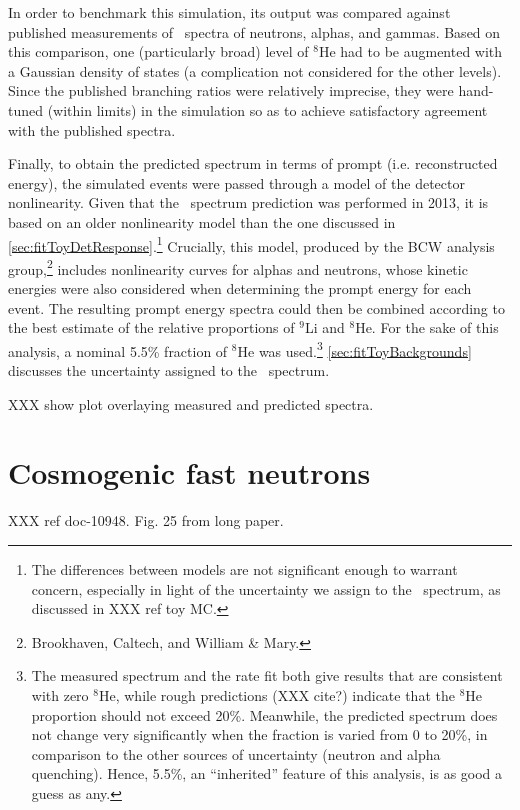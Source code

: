\documentclass[../thesis.tex]{subfiles}
\begin{document}
In order to benchmark this simulation, its output was compared against published
measurements of \LiHe\ spectra of neutrons, alphas, and gammas. Based on this
comparison, one (particularly broad) level of $^8$He had to be augmented with a
Gaussian density of states (a complication not considered for the other
levels). Since the published branching ratios were relatively imprecise, they
were hand-tuned (within limits) in the simulation so as to achieve satisfactory
agreement with the published spectra.

Finally, to obtain the predicted spectrum in terms of prompt (i.e. reconstructed
energy), the simulated events were passed through a model of the detector
nonlinearity. Given that the \LiHe\ spectrum prediction was performed in 2013,
it is based on an older nonlinearity model than the one discussed in
\autoref{sec:fitToyDetResponse}.\footnote{The differences between models are not
  significant enough to warrant concern, especially in light of the uncertainty
  we assign to the \LiHe\ spectrum, as discussed in XXX ref toy MC.} Crucially,
this model, produced by the BCW analysis group,\footnote{Brookhaven, Caltech,
  and William \& Mary.} includes nonlinearity curves for alphas and neutrons,
whose kinetic energies were also considered when determining the prompt energy
for each event. The resulting prompt energy spectra could then be combined
according to the best estimate of the relative proportions of $^9$Li and
$^8$He. For the sake of this analysis, a nominal 5.5\% fraction of $^8$He was
used.\footnote{The measured spectrum and the rate fit both give results that are
  consistent with zero $^8$He, while rough predictions (XXX cite?) indicate that
  the $^8$He proportion should not exceed 20\%. Meanwhile, the predicted
  spectrum does not change very significantly when the fraction is varied from 0
  to 20\%, in comparison to the other sources of uncertainty (neutron and alpha
  quenching). Hence, 5.5\%, an ``inherited'' feature of this analysis, is as
  good a guess as any.} \autoref{sec:fitToyBackgrounds} discusses the
uncertainty assigned to the \LiHe\ spectrum.

XXX show plot overlaying measured and predicted spectra.

\section{Cosmogenic fast neutrons}

XXX ref doc-10948. Fig. 25 from long paper.
\end{document}
